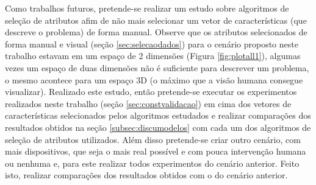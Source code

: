Como trabalhos futuros, pretende-se realizar um estudo sobre algoritmos de seleção de atributos afim de não mais selecionar um vetor de características (que descreve o problema) de forma manual. Observe que os atributos selecionados de forma manual e visual (seção \ref{sec:selecaodados}) para o cenário proposto neste trabalho estavam em um espaço de 2 dimensões (Figura \ref{fig:plotall1}), algumas vezes um espaço de duas dimensões não é suficiente para descrever um problema, o mesmo acontece para um espaço 3D (o máximo que a visão humana consegue visualizar). Realizado este estudo, então pretende-se executar os experimentos realizados neste trabalho (seção \ref{sec:constvalidacao}) em cima dos vetores de características selecionados pelos algoritmos estudados e realizar comparações dos resultados obtidos na seção \ref{subsec:discumodelos} com cada um dos algoritmos de seleção de atributos utilizados. Além disso pretende-se criar outro cenário, com mais dispositivos, que seja o mais real possível e com pouca intervenção humana ou nenhuma e, para este realizar todos experimentos do cenário anterior. Feito isto, realizar comparações dos resultados obtidos com o do cenário anterior.
